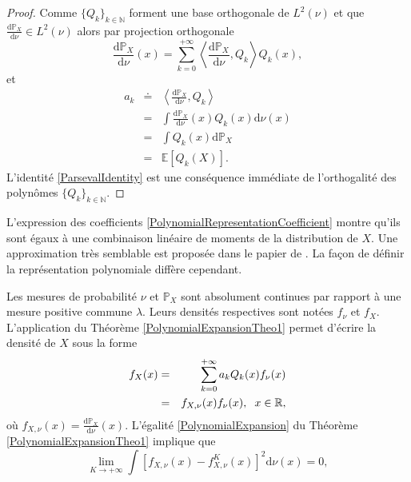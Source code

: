 \begin{proof}
Comme $\{Q_{k}\}_{k\in\mathbb{N}}$ forment une base orthogonale de $L^{2}(\nu)$ et que $\frac{\text{d}\mathbb{P}_{X}}{\text{d}\nu}\in L^{2}(\nu)$ alors par projection orthogonale
\begin{equation}
\frac{\text{d}\mathbb{P}_{X}}{\text{d}\nu}(x)=\sum_{k=0}^{+\infty}\left\langle\frac{\text{d}\mathbb{P}_{X}}{\text{d}\nu},Q_{k}\right\rangle Q_{k}(x),
\end{equation}
et 
\begin{eqnarray*}
a_{k}&\doteq&\left\langle\frac{\text{d}\mathbb{P}_{X}}{\text{d}\nu},Q_{k}\right\rangle\\
&=&\int\frac{\text{d}\mathbb{P}_{X}}{\text{d}\nu}(x)Q_{k}(x)\text{d}\nu(x)\\
&=&\int Q_{k}(x)\text{d}\mathbb{P}_{X}\\
&=&\mathbb{E}\left[Q_{k}(X)\right].
\end{eqnarray*}
L'identité \eqref{ParsevalIdentity} est une conséquence immédiate de l'orthogalité des polynômes $\{Q_{k}\}_{k\in\mathbb{N}}$.
\end{proof}
\begin{Rk}
L'expression des coefficients \eqref{PolynomialRepresentationCoefficient} montre qu'ils sont égaux à une combinaison linéaire de moments de la distribution de $X$. Une approximation très semblable est proposée dans le papier de \citet{Pr05}. La façon de définir la représentation polynomiale diffère cependant.
\end{Rk}
Les mesures de probabilité $\nu$ et $\mathbb{P}_{X}$ sont absolument continues par rapport à une mesure positive commune $\lambda$. Leurs densités respectives sont notées $f_{\nu}$ et $f_{X}$. L'application du Théorème \ref{PolynomialExpansionTheo1} permet d'écrire la densité de $X$ sous la forme 
\begin{eqnarray}\label{PolynomialExpansionDensity}
f_{X}(x)&=&\sum_{k=0}^{+\infty}a_{k}Q_{k}(x)f_{\nu}(x) \\
&=&f_{X,\nu}(x)f_{\nu}(x), \hspace{0.2cm}x\in\mathbb{R}, \nonumber
\end{eqnarray}
où $f_{X,\nu}(x)=\frac{\text{d}\mathbb{P}_{X}}{\text{d}\nu}(x)$. L'égalité \ref{PolynomialExpansion} du Théorème \ref{PolynomialExpansionTheo1} implique que 
\begin{equation}\label{PartialSumConvergence}
\underset{K\rightarrow+\infty}{\lim} \int \left[f_{X,\nu}(x)-f_{X,\nu}^{K}(x)\right]^{2}\text{d}\nu(x) = 0,
\end{equation}

